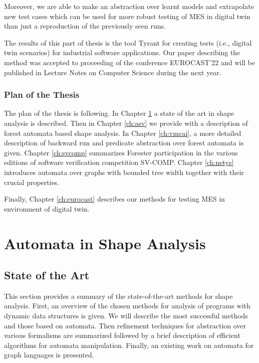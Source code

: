 Moreover, we are able to make an abstraction over learnt models and extrapolate new test
cases which can be used for more robust testing of MES in digital twin than just a reproduction
of the previously seen runs.

The results of this part of thesis is the tool Tyrant \cite{ref_tyrant} for creating tests (i.e., digital twin scenarios) for
industrial software applications.
Our paper describing the method was accepted to proceeding of the conference EUROCAST'22 and will be published
in Lecture Notes on Computer Science during the next year.

\section{Plan of the Thesis}

The plan of the thesis is following.
In Chapter \ref{ch:state-of-the-art} a state of the art in shape analysis is described.
Then in Chapter \ref{ch:asv} we provide with a description of forest automata based
shape analysis.
In Chapter \ref{ch:vmcai}, a more detailed description of backward run and predicate abstraction
over forest automata is given.
Chapter \ref{ch:svcomp} summarizes Forester participation in the various editions
of software verification competition SV-COMP.
Chapter \ref{ch:netys} introduces automata over graphs with bounded tree width together
with their crucial properties.

Finally, Chapter \ref{ch:eurocast} describes our methods for testing MES in environment
of digital twin.

\part{Automata in Shape Analysis}

\chapter{State of the Art}
\label{ch:state-of-the-art}
This section provides a summary of the state-of-the-art methods for shape analysis.
First, an overview of the chosen methods for analysis of programs with
dynamic data structures is given.
We will describe the most successful methods and those based on automata.
Then refinement techniques for abstraction over various formalisms are summarized
followed by a brief description of efficient algorithms for automata manipulation.
Finally, an existing work on automata for graph languages is presented.

